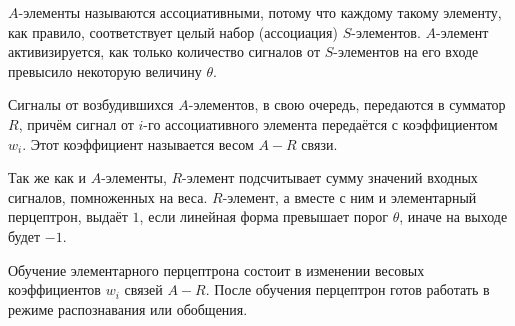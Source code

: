 \documentclass[paper=a4, fontsize=11pt]{scrartcl} %
\numberwithin{equation}{section} %
\numberwithin{figure}{section} %
\numberwithin{table}{section} %
\begin{document}
	$A$-элементы называются ассоциативными, потому что каждому такому элементу, как правило, соответствует целый набор (ассоциация) $S$-элементов. $A$-элемент активизируется, как только количество сигналов от $S$-элементов на его входе превысило некоторую величину $\theta$.
	
	Сигналы от возбудившихся $A$-элементов, в свою очередь, передаются в сумматор $R$, причём сигнал от $i$-го ассоциативного элемента передаётся с коэффициентом $w_{i}$. Этот коэффициент называется весом $A-R$ связи.
	
	Так же как и $A$-элементы, $R$-элемент подсчитывает сумму значений входных сигналов, помноженных на веса. $R$-элемент, а вместе с ним и элементарный перцептрон, выдаёт $1$, если линейная форма превышает порог $\theta$, иначе на выходе будет $-1$.
	
	Обучение элементарного перцептрона состоит в изменении весовых коэффициентов $w_{i}$ связей $A-R$. После обучения перцептрон готов работать в режиме распознавания или обобщения.
	
\end{document}
